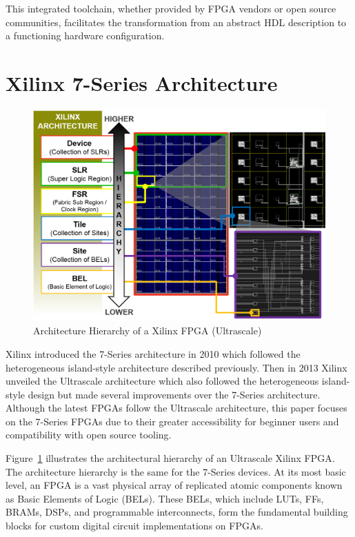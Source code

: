 \documentclass[twocolumn]{article}
\begin{document}
    This integrated toolchain, whether provided by FPGA vendors or open source communities, facilitates the transformation from an abstract HDL description to a functioning hardware configuration.


\section{Xilinx 7-Series Architecture}

    \begin{figure}[t]
        \centering
        \includegraphics[width=12.0cm]{figures/hierarchy.png}
        \caption{Architecture Hierarchy of a Xilinx FPGA (Ultrascale)}
        \label{fig:hierarchy}
    \end{figure}

    Xilinx introduced the 7-Series architecture in 2010 which followed the heterogeneous island-style architecture described previously. 
    Then in 2013 Xilinx unveiled the Ultrascale architecture which also followed the heterogeneous island-style design but made several improvements over the 7-Series architecture.
    Although the latest FPGAs follow the Ultrascale architecture, this paper focuses on the 7-Series FPGAs due to their greater accessibility for beginner users and compatibility with open source tooling.


    Figure~\ref{fig:hierarchy} illustrates the architectural hierarchy of an Ultrascale Xilinx FPGA. 
    The architecture hierarchy is the same for the 7-Series devices. 
    At its most basic level, an FPGA is a vast physical array of replicated atomic components known as Basic Elements of Logic (BELs). 
    These BELs, which include LUTs, FFs, BRAMs, DSPs, and programmable interconnects, form the fundamental building blocks for custom digital circuit implementations on FPGAs. 
\end{document}
